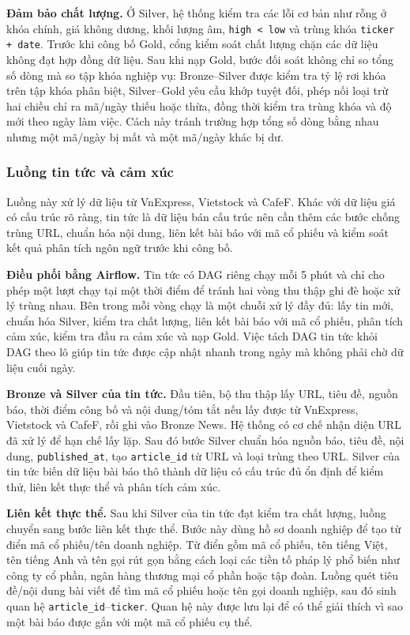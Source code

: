 \documentclass[conference,a4paper]{IEEEtran}
\newcommand{\code}[1]{\texttt{#1}}
\begin{document}
\textbf{Đảm bảo chất lượng.} Ở Silver, hệ thống kiểm tra các lỗi cơ bản như rỗng ở khóa chính, giá không dương, khối lượng âm, \code{high < low} và trùng khóa \code{ticker + date}. Trước khi công bố Gold, cổng kiểm soát chất lượng chặn các dữ liệu không đạt hợp đồng dữ liệu. Sau khi nạp Gold, bước đối soát không chỉ so tổng số dòng mà so tập khóa nghiệp vụ: Bronze--Silver được kiểm tra tỷ lệ rơi khóa trên tập khóa phân biệt, Silver--Gold yêu cầu khớp tuyệt đối, phép nối loại trừ hai chiều chỉ ra mã/ngày thiếu hoặc thừa, đồng thời kiểm tra trùng khóa và độ mới theo ngày làm việc. Cách này tránh trường hợp tổng số dòng bằng nhau nhưng một mã/ngày bị mất và một mã/ngày khác bị dư.

\subsubsection{Luồng tin tức và cảm xúc}

Luồng này xử lý dữ liệu từ VnExpress, Vietstock và CafeF. Khác với dữ liệu giá có cấu trúc rõ ràng, tin tức là dữ liệu bán cấu trúc nên cần thêm các bước chống trùng URL, chuẩn hóa nội dung, liên kết bài báo với mã cổ phiếu và kiểm soát kết quả phân tích ngôn ngữ trước khi công bố.

\textbf{Điều phối bằng Airflow.} Tin tức có DAG riêng chạy mỗi 5 phút và chỉ cho phép một lượt chạy tại một thời điểm để tránh hai vòng thu thập ghi đè hoặc xử lý trùng nhau. Bên trong mỗi vòng chạy là một chuỗi xử lý đầy đủ: lấy tin mới, chuẩn hóa Silver, kiểm tra chất lượng, liên kết bài báo với mã cổ phiếu, phân tích cảm xúc, kiểm tra đầu ra cảm xúc và nạp Gold. Việc tách DAG tin tức khỏi DAG theo lô giúp tin tức được cập nhật nhanh trong ngày mà không phải chờ dữ liệu cuối ngày.

\textbf{Bronze và Silver của tin tức.} Đầu tiên, bộ thu thập lấy URL, tiêu đề, nguồn báo, thời điểm công bố và nội dung/tóm tắt nếu lấy được từ VnExpress, Vietstock và CafeF, rồi ghi vào Bronze News. Hệ thống có cơ chế nhận diện URL đã xử lý để hạn chế lấy lặp. Sau đó bước Silver chuẩn hóa nguồn báo, tiêu đề, nội dung, \code{published\_at}, tạo \code{article\_id} từ URL và loại trùng theo URL. Silver của tin tức biến dữ liệu bài báo thô thành dữ liệu có cấu trúc đủ ổn định để kiểm thử, liên kết thực thể và phân tích cảm xúc.

\textbf{Liên kết thực thể.} Sau khi Silver của tin tức đạt kiểm tra chất lượng, luồng chuyển sang bước liên kết thực thể. Bước này dùng hồ sơ doanh nghiệp để tạo từ điển mã cổ phiếu/tên doanh nghiệp. Từ điển gồm mã cổ phiếu, tên tiếng Việt, tên tiếng Anh và tên gọi rút gọn bằng cách loại các tiền tố pháp lý phổ biến như công ty cổ phần, ngân hàng thương mại cổ phần hoặc tập đoàn. Luồng quét tiêu đề/nội dung bài viết để tìm mã cổ phiếu hoặc tên gọi doanh nghiệp, sau đó sinh quan hệ \code{article\_id}--\code{ticker}. Quan hệ này được lưu lại để có thể giải thích vì sao một bài báo được gắn với một mã cổ phiếu cụ thể.
\end{document}
